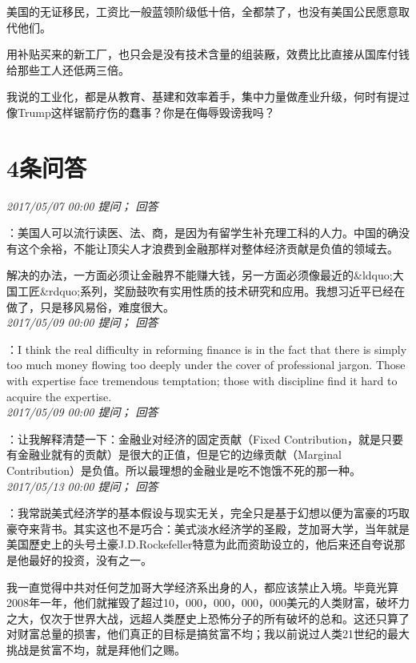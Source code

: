 \documentclass[twocolumn]{ctexart}
\begin{document}
美国的无证移民，工资比一般蓝领阶级低十倍，全都禁了，也没有美国公民愿意取代他们。

用补贴买来的新工厂，也只会是没有技术含量的组装厰，效费比比直接从国库付钱给那些工人还低两三倍。

我说的工业化，都是从教育、基建和效率着手，集中力量做產业升级，何时有提过像Trump这样锯箭疗伤的蠢事？你是在侮辱毁谤我吗？\\

\section{4条问答}

\textit{\hfill\noindent\small 2017/05/07 00:00 提问； 回答}

：美国人可以流行读医、法、商，是因为有留学生补充理工科的人力。中国的确没有这个余裕，不能让顶尖人才浪费到金融那样对整体经济贡献是负值的领域去。

解决的办法，一方面必须让金融界不能赚大钱，另一方面必须像最近的\&ldquo;大国工匠\&rdquo;系列，奖励鼓吹有实用性质的技术研究和应用。我想习近平已经在做了，只是移风易俗，难度很大。\\

\textit{\hfill\noindent\small 2017/05/09 00:00 提问； 回答}

：I think the real difficulty in reforming finance is in the fact that there is simply too much money flowing too deeply under the cover of professional jargon. Those with expertise face tremendous temptation; those with discipline find it hard to acquire the expertise.\\

\textit{\hfill\noindent\small 2017/05/09 00:00 提问； 回答}

：让我解释清楚一下：金融业对经济的固定贡献（Fixed Contribution，就是只要有金融业就有的贡献）是很大的正值，但是它的边缘贡献（Marginal Contribution）是负值。所以最理想的金融业是吃不饱饿不死的那一种。\\

\textit{\hfill\noindent\small 2017/05/13 00:00 提问； 回答}

：我常説美式经济学的基本假设与现实无关，完全只是基于幻想以便为富豪的巧取豪夺来背书。其实这也不是巧合：美式淡水经济学的圣殿，芝加哥大学，当年就是美国歷史上的头号土豪J.D.Rockefeller特意为此而资助设立的，他后来还自夸说那是他最好的投资，没有之一。

我一直觉得中共对任何芝加哥大学经济系出身的人，都应该禁止入境。毕竟光算2008年一年，他们就摧毁了超过10，000，000，000，000美元的人类财富，破坏力之大，仅次于世界大战，远超人类歷史上恐怖分子的所有破坏的总和。这还只算了对财富总量的损害，他们真正的目标是搞贫富不均；我以前说过人类21世纪的最大挑战是贫富不均，就是拜他们之赐。
\end{document}
